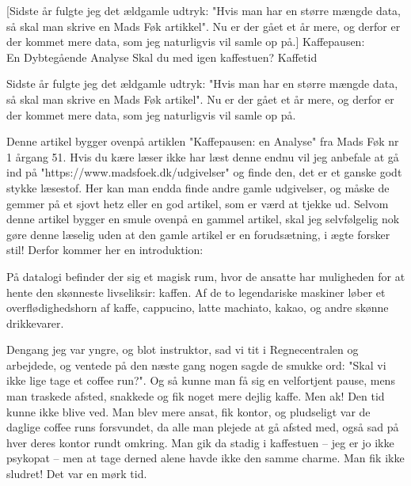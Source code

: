 \begin{article}
[Sidste år fulgte jeg det ældgamle udtryk: "Hvis man har en større mængde data, så skal man skrive en Mads Føk artikkel". Nu er der gået et år mere, og derfor er der kommet mere data, som jeg naturligvis vil samle op på.]
{Kaffepausen: \\ En Dybtegående Analyse}
{Skal du med igen kaffestuen?}
{Kaffetid \protect\coffee\ }

\renewcommand{\figurename}{Figur.}

Sidste år fulgte jeg det ældgamle udtryk: "Hvis man har en større mængde data, så skal man skrive en Mads Føk artikel". Nu er der gået et år mere, og derfor er der kommet mere data, som jeg naturligvis vil samle op på.

Denne artikel bygger ovenpå artiklen "Kaffepausen: en Analyse" fra Mads Føk nr 1 årgang 51. Hvis du kære læser ikke har læst denne endnu vil jeg anbefale at gå ind på "https://www.madsfoek.dk/udgivelser" og finde den, det er et ganske godt stykke læsestof. Her kan man endda finde andre gamle udgivelser, og måske de gemmer på et sjovt hetz eller en god artikel, som er værd at tjekke ud.
Selvom denne artikel bygger en smule ovenpå en gammel artikel, skal jeg selvfølgelig nok gøre denne læselig uden at den gamle artikel er en forudsætning, i ægte forsker stil!
Derfor kommer her en introduktion:

På datalogi befinder der sig et magisk rum, hvor de ansatte har muligheden for at hente den skønneste livseliksir: kaffen. Af de to legendariske maskiner løber et overflødighedshorn af kaffe, cappucino, latte machiato, kakao, og andre skønne drikkevarer.

Dengang jeg var yngre, og blot instruktor, sad vi tit i Regnecentralen og arbejdede, og ventede på den næste gang nogen sagde de smukke ord: "Skal vi ikke lige tage et coffee run?". Og så kunne man få sig en velfortjent pause, mens man traskede afsted, snakkede og fik noget mere dejlig kaffe. Men ak! Den tid kunne ikke blive ved. Man blev mere ansat, fik kontor, og pludseligt var de daglige coffee runs forsvundet, da alle man plejede at gå afsted med, også sad på hver deres kontor rundt omkring. Man gik da stadig i kaffestuen -- jeg er jo ikke psykopat -- men at tage derned alene havde ikke den samme charme. Man fik ikke sludret! Det var en mørk tid.


\end{article}
